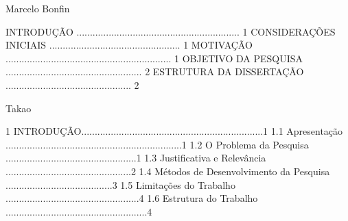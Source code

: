 Marcelo Bonfin

INTRODUÇÃO ............................................................. 1
CONSIDERAÇÕES INICIAIS ................................................. 1
MOTIVAÇÃO .............................................................. 1
OBJETIVO DA PESQUISA ................................................... 2
ESTRUTURA DA DISSERTAÇÃO ............................................... 2





Takao

1 INTRODUÇÃO....................................................................1
1.1 Apresentação ..................................................................1
1.2 O Problema da Pesquisa .................................................1
1.3 Justificativa e Relevância ...............................................2
1.4 Métodos de Desenvolvimento da Pesquisa ........................................3
1.5 Limitações do Trabalho ..................................................4
1.6 Estrutura do Trabalho .....................................................4







